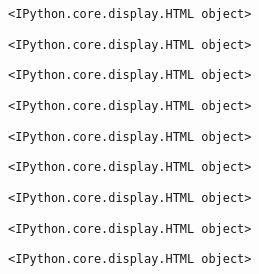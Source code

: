 \documentclass[11pt]{article}
\begin{document}
    
    \begin{Verbatim}[commandchars=\\\{\}]
<IPython.core.display.HTML object>
    \end{Verbatim}

    
    
    \begin{Verbatim}[commandchars=\\\{\}]
<IPython.core.display.HTML object>
    \end{Verbatim}

    
    
    \begin{Verbatim}[commandchars=\\\{\}]
<IPython.core.display.HTML object>
    \end{Verbatim}

    
    
    \begin{Verbatim}[commandchars=\\\{\}]
<IPython.core.display.HTML object>
    \end{Verbatim}

    
    
    \begin{Verbatim}[commandchars=\\\{\}]
<IPython.core.display.HTML object>
    \end{Verbatim}

    
    
    \begin{Verbatim}[commandchars=\\\{\}]
<IPython.core.display.HTML object>
    \end{Verbatim}

    
    
    \begin{Verbatim}[commandchars=\\\{\}]
<IPython.core.display.HTML object>
    \end{Verbatim}

    
    
    \begin{Verbatim}[commandchars=\\\{\}]
<IPython.core.display.HTML object>
    \end{Verbatim}

    
    
    \begin{Verbatim}[commandchars=\\\{\}]
<IPython.core.display.HTML object>
    \end{Verbatim}
\end{document}
